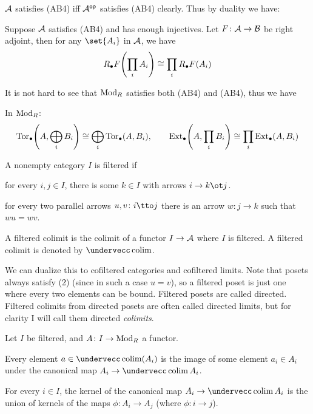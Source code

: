 \edefn

${{\cal A}}$ satisfies (AB4\star) iff ${{\cal A}}^{\sf op}$ satisfies (AB4) clearly.
Thus by duality we have:

\bcoro

    Suppose ${{\cal A}}$ satisfies (AB4\star) and has enough injectives.
    Let $F\colon{{\cal A}}\to{{\cal B}}$ be right adjoint, then for any $\set{A_i}$ in ${{\cal A}}$, we have
    $$ R_\bullet F\mathopen{}\mathclose{\left(\prod_iA_i\right)} \cong \prod_i R_\bullet F(A_i) $$

\ecoro

It is not hard to see that ${\rm Mod}_R$ satisfies both (AB4) and (AB4\star), thus we have

\bcoro

    In ${\rm Mod}_R$:
    $$ {\rm Tor}_\bullet\mathopen{}\mathclose{\left(A,\bigoplus_iB_i\right)}\cong \bigoplus_i{\rm Tor}_\bullet(A,B_i),\qquad {\rm Ext}_\bullet\mathopen{}\mathclose{\left(A,\prod_iB_i\right)} \cong \prod_i{\rm Ext}_\bullet(A,B_i) $$

\ecoro

\bdefn

    A nonempty category $I$ is {\emphcolor filtered} if
    \benum
        \item for every $i,j\in I$, there is some $k\in I$ with arrows $i\to k\ot j$.
        \item for every two parallel arrows $u,v\colon i\tto j$ there is an arrow $w\colon j\to k$ such that $wu=wv$.
    \eenum

    A {\emphcolor filtered colimit} is the colimit of a functor $I\to{{\cal A}}$ where $I$ is filtered.
    A filtered colimit is denoted by $\coflim$.

\edefn

We can dualize this to {\emphcolor cofiltered} categories and {\emphcolor cofiltered limits}.
Note that posets always satisfy (2) (since in such a case $u=v$), so a filtered poset is just one where every two elements can be bound.
Filtered posets are called {\emphcolor directed}.
Filtered colimits from directed posets are often called directed limits, but for clarity I will call them directed {\it colimits}.

\blemm

    Let $I$ be filtered, and $A\colon I\to{\rm Mod}_R$ a functor.
    \benum
        \item Every element $a\in\coflim(A_i)$ is the image of some element $a_i\in A_i$ under the canonical map $A_i\to\coflim A_i$.
        \item For every $i\in I$, the kernel of the canonical map $A_i\to\coflim A_i$ is the union of kernels of the maps $\phi\colon A_i\to A_j$ (where $\phi\colon i\to j$).
    \eenum


